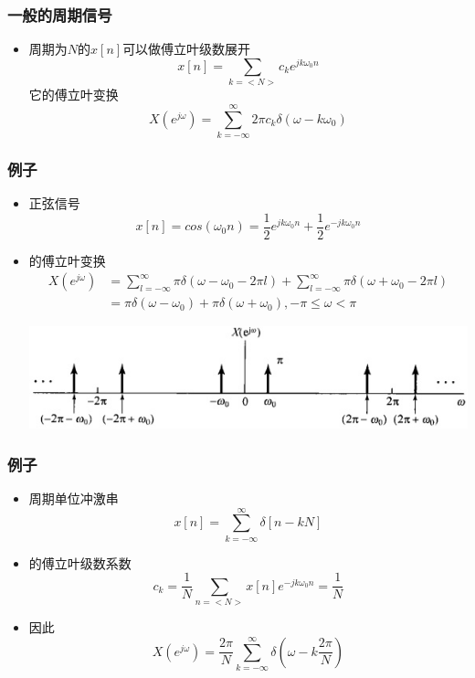 \documentclass[CJKutf8,xcolor=pdftex,dvipsnames,table]{beamer}
\begin{document}
\begin{CJK*}{UTF8}{song}
\begin{frame}
\begin{itemize}
    \end{itemize}
  \end{frame}     
  
  \begin{frame}
    \frametitle{一般的周期信号}
    \begin{itemize}
    \item 周期为$N$的$x[n]$可以做傅立叶级数展开
    \[
    	x[n] = \sum_{k=<N>} c_k e^{jk\omega_0 n}
    \]
    它的傅立叶变换
    \[
    	X(e^{j\omega})=\sum_{k=-\infty}^{\infty}2\pi c_k \delta(\omega - k\omega_0)
    \]
    \end{itemize}

  \end{frame}   
  
  \begin{frame}
    \frametitle{例子}
    \begin{itemize}
    \item 正弦信号
    \[
    	x[n]=cos(\omega_0 n)=\frac{1}{2}e^{jk\omega_0 n}+\frac{1}{2}e^{-jk\omega_0 n}
	\]
	\item 的傅立叶变换
        \begin{align*}
 		X(e^{j\omega}) & = \sum_{l=-\infty}^{\infty}\pi \delta(\omega - \omega_0 - 2\pi l)+\sum_{l=-\infty}^{\infty}\pi \delta(\omega + \omega_0 - 2\pi l) \\
		& = \pi \delta(\omega - \omega_0)+\pi \delta(\omega + \omega_0), -\pi \leq \omega < \pi   
    	\end{align*} 	
	
    	\begin{center}
    	\includegraphics[scale=.5]{ss-c-f5-10}
    	\end{center}
    \end{itemize}

  \end{frame}    
  
  \begin{frame}
    \frametitle{例子}
    \begin{itemize}
    \item 周期单位冲激串
    \[
	    x[n]=\sum_{k=-\infty}^{\infty}\delta[n-kN]
    \]
    \item 的傅立叶级数系数
    \[
    	c_k=\frac{1}{N}\sum_{n=<N>}x[n]e^{-jk\omega_0 n}=\frac{1}{N}
    \]
	\item 因此
        \[
 			X(e^{j\omega}) = \frac{2\pi}{N}\sum_{k=-\infty}^{\infty}\delta(\omega - k\frac{2\pi}{N})   
    	\]	
	

\end{itemize}
\end{frame}
\end{CJK*}
\end{document}
